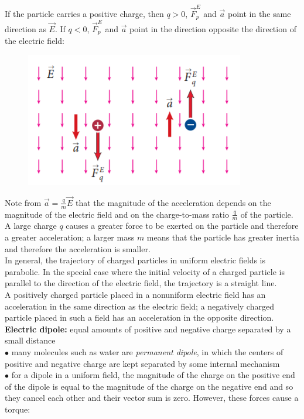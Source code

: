         If the particle carries a positive charge, then $q > 0$, $\vec{F}^E_p$ and $\vec{a}$ point in the same direction as $\vec{E}$. If $q < 0$, $\vec{F}^E_p$ and $\vec{a}$ point in the direction opposite the direction
        of the electric field:

        \begin{figure}[hbt!]
            \centering
            \includegraphics[]{Resources/22.4_Acceleration}
        \end{figure}

        Note from $\vec{a} = \frac{q}{m}\vec{E}$ that the magnitude of the acceleration depends on the magnitude of the electric field and on the charge-to-mass ratio $\frac{q}{m}$ of the particle. A large charge $q$
        causes a greater force to be exerted on the particle and therefore a greater acceleration; a larger mass $m$ means that the particle has greater inertia and therefore the acceleration is smaller. \\

        In general, the trajectory of charged particles in uniform electric fields is parabolic. In the special case where the initial velocity of a charged particle is parallel to the direction of the electric field,
        the trajectory is a straight line. \\

        A positively charged particle placed in a nonuniform electric field has an acceleration in the same direction as the electric field; a negatively charged particle placed in such a field has an acceleration in the
        opposite direction. \\

        \textbf{Electric dipole:} equal amounts of positive and negative charge separated by a small distance \\
        $\bullet$ many molecules such as water are \textit{permanent dipole}, in which the centers of positive and negative charge are kept separated by some internal mechanism \\
        $\bullet$ for a dipole in a uniform field, the magnitude of the charge on the positive end of the dipole is equal to the magnitude of the charge on the negative end and so they cancel each other and their vector
        sum is zero. However, these forces cause a torque:

